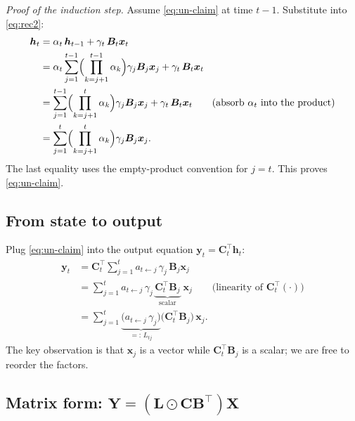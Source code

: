 \documentclass[11pt,a4paper]{article}
\begin{document}
\emph{Proof of the induction step.} Assume \eqref{eq:un-claim} at
time $t-1$. Substitute into \eqref{eq:rec2}:
\begin{align}
  \bm{h}_t
   &= \alpha_t\,\bm{h}_{t-1} + \gamma_t\,\bm{B}_t\bm{x}_t \\
   &= \alpha_t \sum_{j=1}^{t-1}
        \Bigl(\prod_{k=j+1}^{t-1}\alpha_k\Bigr)\gamma_j\bm{B}_j\bm{x}_j
        + \gamma_t\,\bm{B}_t\bm{x}_t \\
   &= \sum_{j=1}^{t-1}
        \Bigl(\prod_{k=j+1}^{t}\alpha_k\Bigr)\gamma_j\bm{B}_j\bm{x}_j
        + \gamma_t\,\bm{B}_t\bm{x}_t
        \qquad\text{(absorb $\alpha_t$ into the product)}\\
   &= \sum_{j=1}^{t}
        \Bigl(\prod_{k=j+1}^{t}\alpha_k\Bigr)\gamma_j\bm{B}_j\bm{x}_j.
\end{align}
The last equality uses the empty-product convention for $j=t$. This
proves \eqref{eq:un-claim}.

\subsection{From state to output}

Plug \eqref{eq:un-claim} into the output equation
$\bm{y}_t = \bm{C}_t^\top\bm{h}_t$:
\begin{align}
  \bm{y}_t
   &= \bm{C}_t^\top \sum_{j=1}^{t}
        a_{t\leftarrow j}\,\gamma_j\,\bm{B}_j\bm{x}_j \\
   &= \sum_{j=1}^{t}
        a_{t\leftarrow j}\,\gamma_j\,
        \underbrace{\bm{C}_t^\top \bm{B}_j}_{\text{scalar}}\;\bm{x}_j
        \qquad\text{(linearity of $\bm{C}_t^\top(\cdot)$)} \label{eq:yout} \\
   &= \sum_{j=1}^{t}
        \underbrace{\bigl(a_{t\leftarrow j}\,\gamma_j\bigr)}_{=:\,L_{tj}}
        \bigl(\bm{C}_t^\top \bm{B}_j\bigr)\,\bm{x}_j. \label{eq:yout-L}
\end{align}
The key observation is that $\bm{x}_j$ is a vector while
$\bm{C}_t^\top\bm{B}_j$ is a scalar; we are free to reorder the
factors.

\subsection{Matrix form: $\bm{Y} = (\bm{L}\odot \bm{C}\bm{B}^\top)\bm{X}$}
\end{document}
